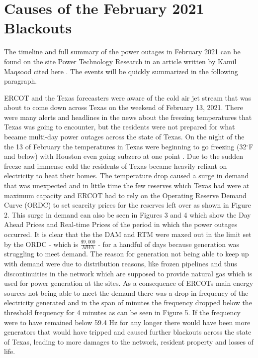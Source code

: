 \documentclass[12pt]{article}
\begin{document}
\section{Causes of the February 2021 Blackouts}
\indent %
\indent The timeline and full summary of the power outages in February 2021 can be found on the site Power Technology Research in an article written by Kamil Maqsood cited here \cite{FreqGraph}. The events will be quickly summarized in the following paragraph.\par
\indent ERCOT and the Texas forecasters were aware of the cold air jet stream that was about to come down across Texas on the weekend of February 13, 2021. There were many alerts and headlines in the news about the freezing temperatures that Texas was going to encounter, but the residents were not prepared for what became multi-day power outages across the state of Texas. On the night of the the 13 of February the temperatures in Texas were beginning to go freezing (32$^{\circ}$F and below) with Houston even going subzero at one point \cite{HoustFreeze}. Due to the sudden freeze and immense cold the residents of Texas became heavily reliant on electricity to heat their homes. The temperature drop caused a surge in demand that was unexpected and in little time the few reserves which Texas had were at maximum capacity and ERCOT had to rely on the Operating Reserve Demand Curve (ORDC) to set scarcity prices for the reserves left over as shown in Figure 2. This surge in demand can also be seen in Figures 3 and 4 which show the Day Ahead Prices and Real-time Prices of the period in which the power outages occurred. It is clear that the the DAM and RTM were maxed out in the limit set by the ORDC - which is $\frac{\$9,000}{MWh}$ - for a handful of days because generation was struggling to meet demand. The reason for generation not being able to keep up with demand were due to distribution reasons, like frozen pipelines and thus discontinuities in the network which are supposed to provide natural gas which is used for power generation at the sites. As a consequence of ERCOTs main energy sources not being able to meet the demand there was a drop in frequency of the electricity generated and in the span of minutes the frequency dropped below the threshold frequency for 4 minutes as can be seen in Figure 5. If the frequency were to have remained below 59.4 Hz for any longer there would have been more generators that would have tripped and caused further blackouts across the state of Texas, leading to more damages to the network, resident property and losses of life. \par
\end{document}
